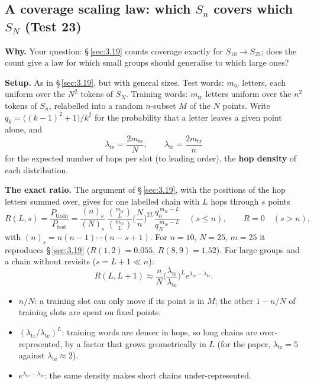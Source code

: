 \documentclass[paper=a4,fontsize=11pt,DIV=11,parskip=half,headings=small,numbers=noendperiod]{scrartcl}
\DeclareRobustCommand{\lead}[1]{\textsf{\bfseries\color{accent}#1}}
\newcommand{\tagpill}[2]{\tcbox[on line,colback=#1,colframe=#1,boxrule=0pt,arc=1.6pt,left=2.4pt,right=2.4pt,top=0.9pt,bottom=0.9pt,boxsep=0pt,tcbox raise base,fontupper={\sffamily\bfseries\fontsize{6.8}{7}\selectfont\color{white}}]{#2}}
\DeclareRobustCommand{\tagnew}{\texorpdfstring{\tagpill{newcol}{NEW}}{[NEW]}}
\begin{document}
\subsection{A coverage scaling law: which \texorpdfstring{$S_n$}{S_n} covers which \texorpdfstring{$S_N$}{S_N}
(Test 23) \tagnew{}}\label{sec:3.27}
\lead{Why.} Your question: \S\,\ref{sec:3.19} counts coverage exactly for $S_{10}\to S_{25}$; does the count
give a law for which small groups should generalise to which large ones?

\lead{Setup.} As in \S\,\ref{sec:3.19}, but with general sizes. Test words: $m_{\text{te}}$ letters, each
uniform over the $N^2$ tokens of $S_N$. Training words: $m_{\text{tr}}$ letters uniform over the $n^2$ tokens of
$S_n$, relabelled into a random $n$-subset $M$ of the $N$ points. Write $q_k=\big((k-1)^2+1\big)/k^2$ for the
probability that a letter leaves a given point alone, and
\[ \lambda_{\text{te}}=\frac{2m_{\text{te}}}{N},\qquad \lambda_{\text{tr}}=\frac{2m_{\text{tr}}}{n} \]
for the expected number of hops per slot (to leading order), the \textbf{hop density} of each distribution.

\lead{The exact ratio.} The argument of \S\,\ref{sec:3.19}, with the positions of the hop letters summed over,
gives for one labelled chain with $L$ hops through $s$ points
\[
R(L,s)=\frac{P_{\text{train}}}{P_{\text{test}}}=\frac{(n)_s}{(N)_s}\,\frac{\binom{m_{\text{tr}}}{L}}{\binom{m_{\text{te}}}{L}}\Big(\frac{N}{n}\Big)^{2L}\frac{q_n^{\,m_{\text{tr}}-L}}{q_N^{\,m_{\text{te}}-L}}\quad(s\le
n),\qquad R=0\quad(s>n), \]
with $(n)_s=n(n-1)\cdots(n-s+1)$. For $n=10$, $N=25$, $m=25$ it reproduces \S\,\ref{sec:3.19} ($R(1,2)=0.055$,
$R(8,9)=1.52$). For large groups and a chain without revisits ($s=L+1\ll n$):
\[
R(L,L+1)\approx\frac{n}{N}\Big(\frac{\lambda_{\text{tr}}}{\lambda_{\text{te}}}\Big)^{L}e^{\lambda_{\text{te}}-\lambda_{\text{tr}}}.
\]
\begin{itemize}
\item $n/N$: a training slot can only move if its point is in $M$; the other $1-n/N$ of training slots are spent
  on fixed points.
\item $(\lambda_{\text{tr}}/\lambda_{\text{te}})^L$: training words are denser in hops, so long chains are
  over-represented, by a factor that grows geometrically in $L$ (for the paper, $\lambda_{\text{tr}}=5$ against
  $\lambda_{\text{te}}\approx2$).
\item $e^{\lambda_{\text{te}}-\lambda_{\text{tr}}}$: the same density makes short chains under-represented.
\end{itemize}
\end{document}
